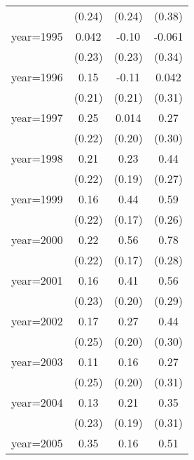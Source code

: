 \begin{sidewaystable}[htbp]
\begin{tabular}{l*{3}{c}}
                &   (0.24)         &   (0.24)         &   (0.38)         \\
\addlinespace
year=1995       &    0.042         &    -0.10         &   -0.061         \\
                &   (0.23)         &   (0.23)         &   (0.34)         \\
\addlinespace
year=1996       &     0.15         &    -0.11         &    0.042         \\
                &   (0.21)         &   (0.21)         &   (0.31)         \\
\addlinespace
year=1997       &     0.25         &    0.014         &     0.27         \\
                &   (0.22)         &   (0.20)         &   (0.30)         \\
\addlinespace
year=1998       &     0.21         &     0.23         &     0.44         \\
                &   (0.22)         &   (0.19)         &   (0.27)         \\
\addlinespace
year=1999       &     0.16         &     0.44\sym{**} &     0.59\sym{**} \\
                &   (0.22)         &   (0.17)         &   (0.26)         \\
\addlinespace
year=2000       &     0.22         &     0.56\sym{***}&     0.78\sym{***}\\
                &   (0.22)         &   (0.17)         &   (0.28)         \\
\addlinespace
year=2001       &     0.16         &     0.41\sym{**} &     0.56\sym{*}  \\
                &   (0.23)         &   (0.20)         &   (0.29)         \\
\addlinespace
year=2002       &     0.17         &     0.27         &     0.44         \\
                &   (0.25)         &   (0.20)         &   (0.30)         \\
\addlinespace
year=2003       &     0.11         &     0.16         &     0.27         \\
                &   (0.25)         &   (0.20)         &   (0.31)         \\
\addlinespace
year=2004       &     0.13         &     0.21         &     0.35         \\
                &   (0.23)         &   (0.19)         &   (0.31)         \\
\addlinespace
year=2005       &     0.35         &     0.16         &     0.51\sym{*}  \\

\end{tabular}
\end{sidewaystable}
